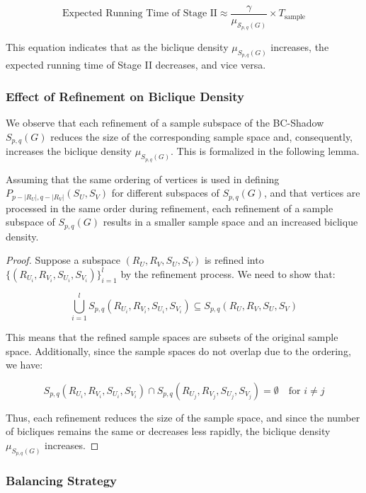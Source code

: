 \[
\text{Expected Running Time of Stage II} \approx \frac{\gamma}{\mu_{\mathcal{S}_{p,q}(G)}} \times T_{\text{sample}}
\tag{8}
\]

This equation indicates that as the biclique density $ \mu_{S_{p,q}(G)} $ increases, the expected running time of Stage II decreases, and vice versa.

\subsubsection{Effect of Refinement on Biclique Density}

We observe that each refinement of a sample subspace of the BC-Shadow $ S_{p,q}(G) $ reduces the size of the corresponding sample space and, consequently, increases the biclique density $ \mu_{S_{p,q}(G)} $. This is formalized in the following lemma.

\begin{lemma}
	Assuming that the same ordering of vertices is used in defining $ P_{p-|R_U|, q-|R_V|}(S_U, S_V) $ for different subspaces of $ S_{p,q}(G) $, and that vertices are processed in the same order during refinement, each refinement of a sample subspace of $ S_{p,q}(G) $ results in a smaller sample space and an increased biclique density.
\end{lemma}

\begin{proof}
	Suppose a subspace $ (R_U, R_V, S_U, S_V) $ is refined into \\ $\{(R_{U_i}, R_{V_i}, S_{U_i}, S_{V_i})\}_{i=1}^l $ by the refinement process. We need to show that:

	\[
	\bigcup_{i=1}^l S_{p,q}(R_{U_i}, R_{V_i}, S_{U_i}, S_{V_i}) \subseteq S_{p,q}(R_U, R_V, S_U, S_V)
	\]

	This means that the refined sample spaces are subsets of the original sample space. Additionally, since the sample spaces do not overlap due to the ordering, we have:

	\[
	S_{p,q}(R_{U_i}, R_{V_i}, S_{U_i}, S_{V_i}) \cap S_{p,q}(R_{U_j}, R_{V_j}, S_{U_j}, S_{V_j}) = \emptyset \quad \text{for } i \neq j
	\]

	Thus, each refinement reduces the size of the sample space, and since the number of bicliques remains the same or decreases less rapidly, the biclique density $ \mu_{S_{p,q}(G)} $ increases.
\end{proof}

\subsubsection{Balancing Strategy}

